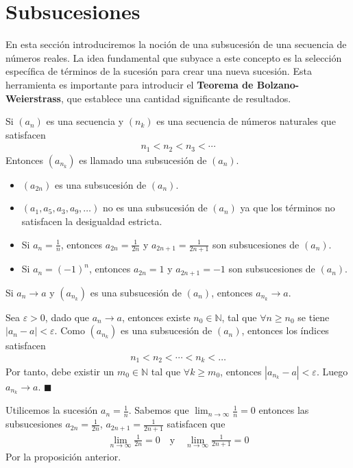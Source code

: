 \documentclass[12pt]{book}
\renewenvironment{proof}[1][\textit{Demostración}]{%
  \par\noindent{\bfseries #1.}\enspace}{\hfill$\blacksquare$\par}
\begin{document}
\section{Subsucesiones}
En esta sección introduciremos la noción de una subsucesión de una secuencia de números reales. La idea fundamental que subyace a este concepto es la selección específica de términos de la sucesión para crear una nueva sucesión. Esta herramienta es importante para introducir el \textbf{Teorema de Bolzano-Weierstrass}, que establece una cantidad significante de resultados.
\begin{defi}{}{}
    Si $(a_n)$ es una secuencia y $(n_k)$ es una secuencia de números naturales que satisfacen 
    \begin{align*}
        n_1 < n_2 < n_3 < \cdots 
    \end{align*}
    Entonces $(a_{n_k})$ es llamado una subsucesión de $(a_n)$.
\end{defi}
\begin{eje}{}{}
    \begin{itemize}
        \item $(a_{2n})$ es una subsucesión de $(a_n)$.
        \item $(a_1,a_5,a_3,a_9,\ldots )$ no es una subsucesión de $(a_n)$ ya que los términos no satisfacen la desigualdad estricta.
        \item Si $a_n= \displaystyle \frac{1}{n}$, entonces $a_{2n}=\displaystyle \frac{1}{2n}$ y $\displaystyle a_{2n+1}=\frac{1}{2n+1}$ son subsucesiones de $(a_n)$.

        \item Si $a_n=(-1)^n$, entonces $a_{2n}=1$ y $a_{2n+1}=-1$ son subsucesiones de $(a_n)$.
    \end{itemize}
\end{eje}
\begin{prop}{}{}
    Si $a_n \to a$ y $(a_{n_k})$ es una subsucesión de $(a_n)$, entonces $a_{n_k} \to a$.
\end{prop}
\begin{proof}
    Sea $\varepsilon>0$, dado que $a_n \to a$, entonces existe $n_0 \in \mathbb{N}$, tal que $\forall n \geq n_0$ se tiene $|a_n-a|<\varepsilon$. Como $(a_{n_k})$ es una subsucesión de $(a_n)$, entonces los índices satisfacen
    \begin{align*}
        n_1<n_2< \cdots < n_k < \ldots 
    \end{align*}
    Por tanto, debe existir un $m_0 \in \mathbb{N}$ tal que $\forall k \geq m_0$, entonces $|a_{n_k}-a|<\varepsilon$. Luego $a_{n_k} \to a$.
\end{proof}
\begin{eje}{}{}
    Utilicemos la sucesión $a_n= \displaystyle \frac{1}{n}$. Sabemos que $\displaystyle\lim_{n \to \infty} \frac{1}{n}=0$ entonces las subsucesiones $a_{2n}=\displaystyle \frac{1}{2n}$, $\displaystyle a_{2n+1}=\frac{1}{2n+1}$ satisfacen que 
    \begin{align*}
        \lim_{n \to \infty} \frac{1}{2n}=0 \quad \text{y} \quad         \lim_{n \to \infty} \frac{1}{2n+1}=0
    \end{align*}
    Por la proposición anterior.
\end{eje}
\end{document}
